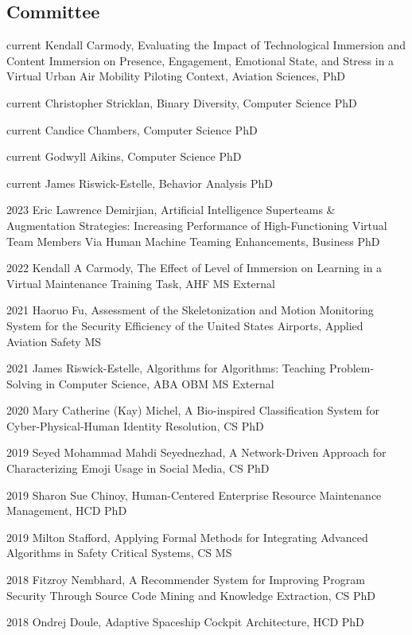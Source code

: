 \documentclass[12pt,letterpaper]{report}
\newcommand{\listitemspace}{0.25em}
\renewenvironment{itemize}
{\begin{list}{}{\setlength{\leftmargin}{0em}
                \setlength{\parskip}{0em}
                \setlength{\itemsep}{\listitemspace}
                \setlength{\parsep}{\listitemspace}}}
{\end{list}}
\begin{document}
    \subsection*{Committee}
    \begin{itemize}
    \item current Kendall Carmody, Evaluating the Impact of Technological Immersion and Content Immersion on Presence, Engagement, Emotional State, and Stress in a Virtual Urban Air Mobility Piloting Context, Aviation Sciences, PhD
    \item current Christopher Stricklan, Binary Diversity, Computer Science PhD
    \item current Candice Chambers, Computer Science PhD
    \item current Godwyll Aikins, Computer Science PhD
    \item current James Riswick-Estelle, Behavior Analysis PhD
    \item  2023 Eric Lawrence Demirjian, Artificial Intelligence Superteams \& Augmentation Strategies: Increasing Performance of High-Functioning Virtual Team Members Via Human Machine Teaming Enhancements, Business PhD
    \item 2022 Kendall A Carmody, The Effect of Level of Immersion on Learning in a Virtual Maintenance Training Task, AHF MS External
    \item 2021 Haoruo Fu, Assessment of the Skeletonization and Motion Monitoring System for the Security Efficiency of the United States Airports, Applied Aviation Safety MS
    \item 2021 James Riswick-Estelle, Algorithms for Algorithms: Teaching Problem-Solving in Computer Science, ABA OBM MS External
    \item 2020 Mary Catherine (Kay) Michel, A Bio-inspired Classification System for Cyber-Physical-Human Identity Resolution, CS PhD
    \item 2019 Seyed Mohammad Mahdi Seyednezhad, A Network-Driven Approach for Characterizing Emoji Usage in Social Media, CS PhD
    \item 2019 Sharon Sue Chinoy, Human-Centered Enterprise Resource Maintenance Management, HCD PhD
    \item 2019 Milton Stafford, Applying Formal Methods for Integrating Advanced Algorithms in Safety Critical Systems, CS MS
    \item 2018 Fitzroy Nembhard, A Recommender System for Improving Program Security Through Source Code Mining and Knowledge Extraction, CS PhD
    \item 2018 Ondrej Doule, Adaptive Spaceship Cockpit Architecture, HCD PhD    

\end{itemize}
\end{document}
